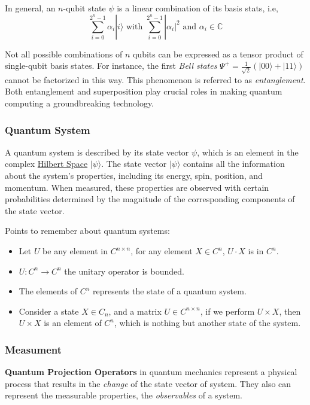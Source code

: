\documentclass[11pt]{article}
\providecommand{\ket}[1]{|#1\rangle}
\theoremstyle{definition}
\theoremstyle{definition}
\begin{document}
In general, an \(n\text{-qubit}\) state \(\psi\) is a linear combination of its basis stats, i.e,
$$
    \sum_{i=0}^{2^n-1} \alpha_i \ket{i} \text{ with } \sum_{i=0}^{2^n-1} |\alpha_i|^2 \text{ and } \alpha_i \in \mathbb{C}
    $$

Not all possible combinations of \(n\) qubits can be expressed as a tensor product
of single-qubit basis states. 
For instance, the first \emph{Bell states} 
\(\Psi^+ = \frac{1}{\sqrt{2}}(\ket{00} + \ket{11})\) 
cannot be factorized in this way. 
This phenomenon is referred to as \emph{entanglement}. 
Both entanglement and superposition play crucial roles in making quantum
computing a groundbreaking technology.

\subsubsection{Quantum System}
\label{sec:org855aed4}
A quantum system is described by its state vector \(\psi\),
which is an element in the complex \hyperref[sec:org36afc5a]{Hilbert
Space} \(\ket{\psi}\).
The state vector \(\ket{\psi}\) contains all the information about the system's
properties, including its energy, spin, position, and momentum. When
measured, these properties are observed with certain probabilities
determined by the magnitude of the corresponding components of the state
vector.

Points to remember about quantum systems:
\begin{itemize}
\item Let \(U\) be any element in \(C^{n \times n}\), for any element \(X \in C^n\), \(U
      \cdot X\) is in \(C^n\).
\item \(U: C^n \rightarrow C^n\) the unitary operator is bounded.
\item The elements of \(C^n\) represents the state of a quantum system.
\item Consider a state \(X \in C_n\), and a matrix \(U \in C^{n \times n}\), if we
perform \(U \times X\), then \(U \times X\) is an element of \(C^n\), which is
nothing but another state of the system.
\end{itemize}


\subsubsection{Measument}
\label{sec:org1449b6a}
\textbf{Quantum Projection Operators} in quantum mechanics represent a physical
process that results in the \emph{change} of the state vector of system. 
They also can represent the measurable properties, the \emph{observables} of a
system.
\end{document}
